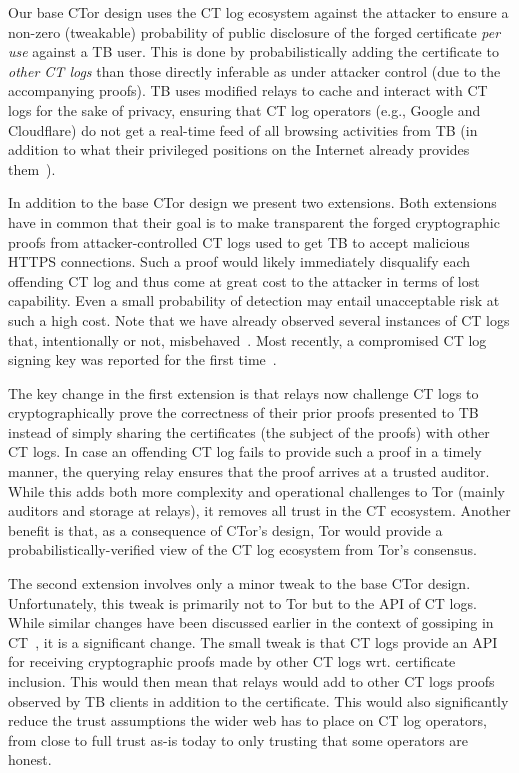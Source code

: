 Our base CTor design uses the CT log ecosystem against the attacker to ensure a
non-zero (tweakable) probability of public disclosure of the forged certificate
\emph{per use} against a TB user. This is done by probabilistically adding the
certificate to \emph{other CT logs} than those directly inferable as under
attacker control (due to the accompanying proofs). TB uses modified relays to
cache and interact with CT logs for the sake of privacy, ensuring that CT log
operators (e.g., Google and Cloudflare) do not get a real-time feed of all
browsing activities from TB (in addition to what their privileged positions on
the Internet already provides them~\cite{1mtrack,TorDNS}).

In addition to the base CTor design we present two extensions. Both extensions
have in common that their goal is to make transparent the forged cryptographic
proofs from attacker-controlled CT logs used to get TB to accept malicious HTTPS
connections. Such a proof would likely immediately disqualify each offending CT
log and thus come at great cost to the attacker in terms of lost capability.
Even a small probability of detection may entail unacceptable risk at such a
high cost. Note that we have already observed several instances of CT logs that,
intentionally or not,
misbehaved~\cite{izenpe-disqualified,venafi-disqualified,gdca1-omission}. Most
recently, a compromised CT log signing key was reported for the first
time~\cite{digicert-log-compromised}. 

The key change in the first extension is that relays now challenge CT logs to
cryptographically prove the correctness of their prior proofs presented to TB
instead of simply sharing the certificates (the subject of the proofs) with
other CT logs. In case an offending CT log fails to provide such a proof in a
timely manner, the querying relay ensures that the proof arrives at a trusted
auditor. While this adds both more complexity and operational challenges to Tor
(mainly auditors and storage at relays), it removes all trust in the CT
ecosystem. Another benefit is that, as a consequence of CTor's design, Tor would
provide a probabilistically-verified view of the CT log ecosystem from Tor's
consensus.

The second extension involves only a minor tweak to the base CTor design.
Unfortunately, this tweak is primarily not to Tor but to the API of CT logs.
While similar changes have been discussed earlier in the context of gossiping in
CT~\cite{minimal-gossip,nordberg}, it is a significant change. The small tweak
is that CT logs provide an API for receiving cryptographic proofs made by other
CT logs wrt. certificate inclusion. This would then mean that relays would add
to other CT logs proofs observed by TB clients in addition to the certificate.
This would also significantly reduce the trust assumptions the wider web has to
place on CT log operators, from close to full trust as-is today to only trusting
that some operators are honest.

